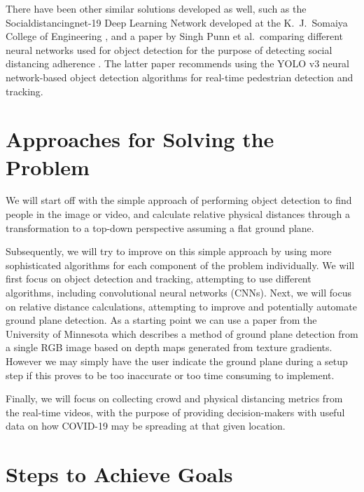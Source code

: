 \documentclass{scrartcl}
\newcommand{\todo}[1]{\ifthenelse{\boolean{showtodo}}{
  \begin{tcolorbox}[colback=white,colframe=red,arc=1pt,outer arc=1pt,boxrule=1pt]\textcolor{red}{#1}\end{tcolorbox}
  {}}}
\begin{document}
There have been other similar solutions developed as well,
such as the Socialdistancingnet-19 Deep Learning Network developed at 
the K.\ J.\ Somaiya College of Engineering \cite{socdistksomaiya},
and a paper by Singh Punn et al.\ comparing different neural networks used for object detection
for the purpose of detecting social distancing adherence \cite{socialdistyolo}.
The latter paper recommends using the YOLO v3 neural network-based object detection algorithms 
for real-time pedestrian detection and tracking.

\section{Approaches for Solving the Problem}
\todo{What approaches are you going to try and why do you think these approaches might work?}

We will start off with the simple approach of performing object detection to 
find people in the image or video, 
and calculate relative physical distances through a transformation to a top-down perspective
assuming a flat ground plane.

Subsequently, we will try to improve on this simple approach by using more sophisticated
algorithms for each component of the problem individually.
We will first focus on object detection and tracking, attempting to use different algorithms,
including convolutional neural networks (CNNs).
Next, we will focus on relative distance calculations,
attempting to improve and potentially automate ground plane detection.
As a starting point we can use a paper from the University of Minnesota
which describes a method
of ground plane detection from a single RGB image based on depth maps 
generated from texture gradients. However we may simply have the user
indicate the ground plane during a setup step if this proves to be too inaccurate
or too time consuming to implement.

Finally, we will focus on collecting crowd and physical distancing metrics
from the real-time videos, with the purpose of providing decision-makers 
with useful data on how COVID-19 may be spreading at that given location. 

\section{Steps to Achieve Goals}
\todo{What steps are you going to take to achieve your goals in this project?}
\end{document}
